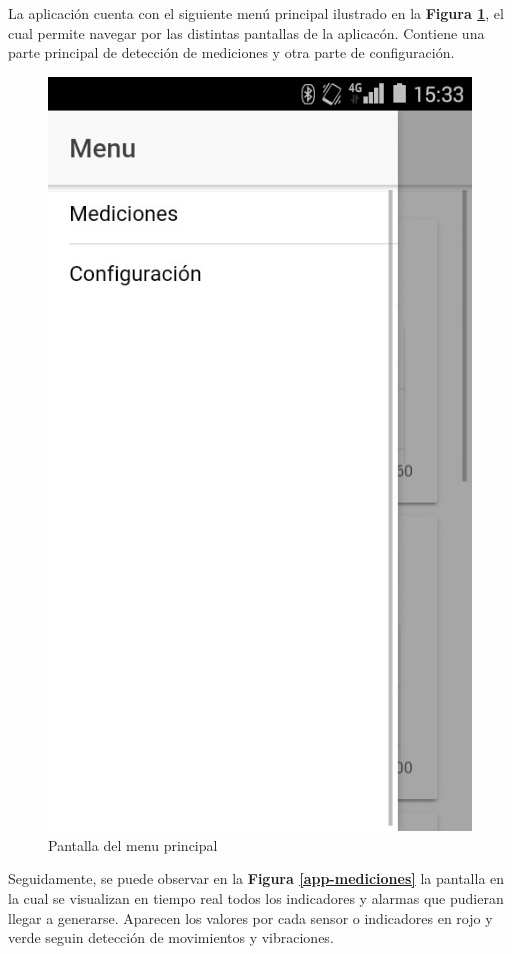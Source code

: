 \documentclass{IEEEtran}
\begin{document}
			La aplicación cuenta con el siguiente menú principal ilustrado en la \textbf{Figura \ref{app-menu}}, el cual permite navegar por las distintas pantallas de la aplicacón. Contiene una parte principal de detección de mediciones y otra parte de configuración.

			\begin{figure}
				\centering
				\includegraphics[width=0.5\linewidth]{app-menu}
				\caption{Pantalla del menu principal}
				\label{app-menu}
			\end{figure}

			Seguidamente, se puede observar en la \textbf{Figura \ref{app-mediciones}} la pantalla en la cual se visualizan en tiempo real todos los indicadores y alarmas que pudieran llegar a generarse. Aparecen los valores por cada sensor o indicadores en rojo y verde seguin detección de movimientos y vibraciones.
\end{document}
